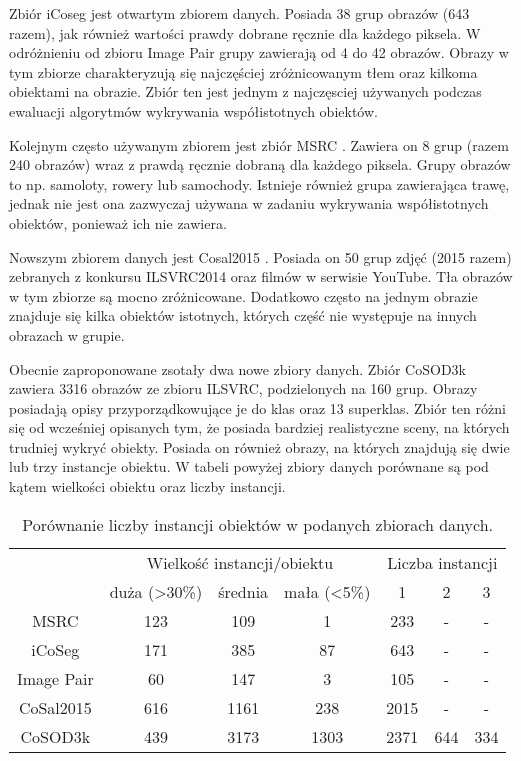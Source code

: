 \documentclass[a4paper,12pt,twoside,openany]{report}
\begin{document}
	Zbiór iCoseg \cite{iCoseg} jest otwartym zbiorem danych. Posiada 38 grup obrazów (643 razem), jak również wartości prawdy dobrane ręcznie dla każdego piksela. W odróżnieniu od zbioru Image Pair grupy zawierają od 4 do 42 obrazów. Obrazy w tym zbiorze charakteryzują się najczęściej zróżnicowanym tłem oraz kilkoma obiektami na obrazie. Zbiór ten jest jednym z najczęsciej używanych podczas ewaluacji algorytmów wykrywania współistotnych obiektów.

	Kolejnym często używanym zbiorem jest zbiór MSRC \cite{MSRC}. Zawiera on 8 grup (razem 240 obrazów) wraz z prawdą ręcznie dobraną dla każdego piksela. Grupy obrazów to np. samoloty, rowery lub samochody. Istnieje również grupa zawierająca trawę, jednak nie jest ona zazwyczaj używana w zadaniu wykrywania współistotnych obiektów, ponieważ ich nie zawiera.

	Nowszym zbiorem danych jest Cosal2015 \cite{cosal2015}. Posiada on 50 grup zdjęć (2015 razem) zebranych z konkursu ILSVRC2014 oraz filmów w serwisie YouTube. Tła obrazów w tym zbiorze są mocno zróżnicowane. Dodatkowo często na jednym obrazie znajduje się kilka obiektów istotnych, których część nie występuje na innych obrazach w grupie.
 
	
	Obecnie zaproponowane zsotały dwa nowe zbiory danych. Zbiór CoSOD3k \cite{fan2020rethinking} zawiera 3316 obrazów ze zbioru ILSVRC, podzielonych na 160 grup. Obrazy posiadają opisy przyporządkowujące je do klas oraz 13 superklas. Zbiór ten różni się od wcześniej opisanych tym, że posiada bardziej realistyczne sceny, na których trudniej wykryć obiekty. Posiada on również obrazy, na których znajdują się dwie lub trzy instancje obiektu. W tabeli powyżej zbiory danych porównane są pod kątem wielkości obiektu oraz liczby instancji.

	\begin{table}[]
		\caption{Porównanie liczby instancji obiektów w podanych zbiorach danych.}
		\begin{tabular}{c||ccc||ccc}
		\hline
				   & \multicolumn{3}{c||}{Wielkość instancji/obiektu}             & \multicolumn{3}{c}{Liczba instancji} \\
				   & duża (\textgreater{}30\%) & średnia & mała (\textless{}5\%) & 1          & 2        & 3       \\ \hline
		MSRC       & 123                       & 109     & 1                     & 233        & -        & -        \\
		iCoSeg     & 171                       & 385     & 87                    & 643        & -        & -        \\
		Image Pair & 60                        & 147     & 3                     & 105        & -        & -        \\
		CoSal2015  & 616                       & 1161    & 238                   & 2015      & -        & -        \\ \hline \hline
		CoSOD3k    & 439                       & 3173    & 1303                  & 2371       & 644      & 334      \\ \hline
		\end{tabular}
	\end{table}
\end{document}
